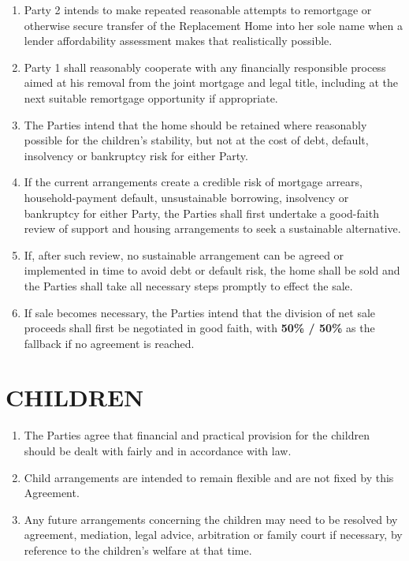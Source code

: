 \documentclass[10pt,a4paper]{article}
\begin{document}
\begin{enumerate}[label=\arabic*., start=48, leftmargin=1.8em]
    \item Party 2 intends to make repeated reasonable attempts to remortgage or otherwise secure transfer of the Replacement Home into her sole name when a lender affordability assessment makes that realistically possible.
    \item Party 1 shall reasonably cooperate with any financially responsible process aimed at his removal from the joint mortgage and legal title, including at the next suitable remortgage opportunity if appropriate.
    \item The Parties intend that the home should be retained where reasonably possible for the children's stability, but not at the cost of debt, default, insolvency or bankruptcy risk for either Party.
    \item If the current arrangements create a credible risk of mortgage arrears, household-payment default, unsustainable borrowing, insolvency or bankruptcy for either Party, the Parties shall first undertake a good-faith review of support and housing arrangements to seek a sustainable alternative.
    \item If, after such review, no sustainable arrangement can be agreed or implemented in time to avoid debt or default risk, the home shall be sold and the Parties shall take all necessary steps promptly to effect the sale.
    \item If sale becomes necessary, the Parties intend that the division of net sale proceeds shall first be negotiated in good faith, with \textbf{50\% / 50\%} as the fallback if no agreement is reached.
\end{enumerate}

\section*{CHILDREN}

\begin{enumerate}[label=\arabic*., start=54, leftmargin=1.8em]
    \item The Parties agree that financial and practical provision for the children should be dealt with fairly and in accordance with law.
    \item Child arrangements are intended to remain flexible and are not fixed by this Agreement.
    \item Any future arrangements concerning the children may need to be resolved by agreement, mediation, legal advice, arbitration or family court if necessary, by reference to the children's welfare at that time.
\end{enumerate}
\end{document}
